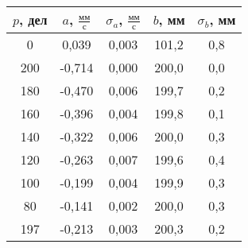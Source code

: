 \begin{tabular}[t]{|c|c|c|c|c|}
\hline
$p$, дел & $a$, $\frac{мм}{с}$ & $\sigma_a$, $\frac{мм}{с}$ & $b$, мм & $\sigma_b$, мм \\ 
\hline
0 & 0,039 & 0,003 & 101,2 & 0,8 \\ 
200 & -0,714 & 0,000 & 200,0 & 0,0 \\ 
180 & -0,470 & 0,006 & 199,7 & 0,2 \\ 
160 & -0,396 & 0,004 & 199,8 & 0,1 \\ 
140 & -0,322 & 0,006 & 200,0 & 0,3 \\ 
120 & -0,263 & 0,007 & 199,6 & 0,4 \\ 
100 & -0,199 & 0,004 & 199,9 & 0,3 \\ 
80 & -0,141 & 0,002 & 200,0 & 0,3 \\ 
197 & -0,213 & 0,003 & 200,3 & 0,2 \\ 
\hline
\end{tabular}